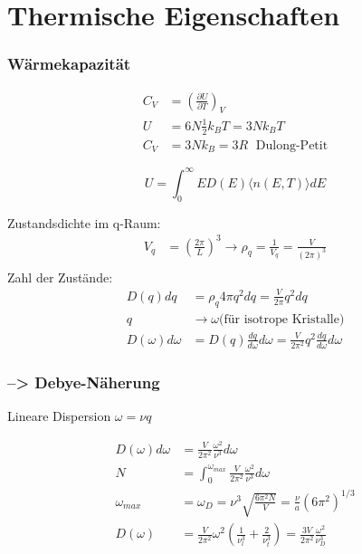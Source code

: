 \section{Thermische Eigenschaften}

\subsubsection*{Wärmekapazität}

\begin{equation*}
    \begin{aligned}
        C_V &= \left(\frac{\partial U}{\partial T}\right)_V \\
        U &= 6N \frac{1}{2} k_B T = 3 N k_B T \\
        C_V &= 3Nk_B = 3R \; \text{ Dulong-Petit}
    \end{aligned}
\end{equation*}

\begin{equation*}
    U = \int_0^\infty E D(E) \langle n(E,T) \rangle dE
\end{equation*}

Zustandsdichte im q-Raum:
\begin{equation*}
    \begin{aligned}
        V_q &= \left(\frac{2 \pi}{L}\right)^3 \rightarrow \rho_q = \frac{1}{V_q} = \frac{V}{(2\pi)^3} \\
    \end{aligned}
\end{equation*}
Zahl der Zustände:
\begin{equation*}
    \begin{aligned}
        D(q) dq &= \rho_q 4 \pi q^2 dq = \frac{V}{2 \pi} q^2 dq \\
        q & \rightarrow \omega \text{(für isotrope Kristalle)} \\
        D(\omega) d\omega &= D(q) \frac{dq}{d\omega} d\omega = \frac{V}{2 \pi^2} q^2 \frac{dq}{d \omega} d\omega
    \end{aligned}
\end{equation*}

\subsubsection*{--> Debye-Näherung}
Lineare Dispersion $\omega = \nu q$

\begin{equation*}
    \begin{aligned}
        D(\omega)d \omega &= \frac{V}{2 \pi^2} \frac{\omega^2}{\nu^3} d\omega  \\
        N &= \int_0^{\omega_{max}} \frac{V}{2 \pi^2} \frac{\omega^2}{\nu^3} d\omega \\
        \omega_{max} &= \omega_D = \nu^3 \sqrt{\frac{6 \pi^2 N}{V}} = \frac{\nu}{a} \left(6 \pi^2\right)^{1/3} \\
        D(\omega) &= \frac{V}{2 \pi^2} \omega^2 \left(\frac{1}{\nu_l^3} + \frac{2}{\nu_t^3}\right) = \frac{3 V}{2 \pi^2} \frac{\omega^2}{\nu_D^3}
    \end{aligned}
\end{equation*}

